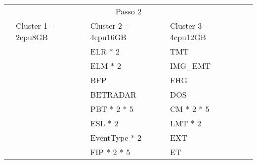 \begin{table}[H]
  \centering
  \small
  \setlength{\extrarowheight}{3pt}
  \setlength{\arrayrulewidth}{1pt}
  
  \begin{tabular}{|l|l|l|l|l|}
    \hline
    \cellcolor{white} & \multicolumn{3}{|c|}{\cellcolor[HTML]{FBE6A3}Passo 2} & \cellcolor{white}              \\ \cline{1-5} 
                                     & \cellcolor[HTML]{4EAC5B}Cluster 1 - 2cpu8GB & \cellcolor[HTML]{4EAC5B}Cluster 2 - 4cpu16GB & \cellcolor[HTML]{4EAC5B}Cluster 3 - 4cpu12GB &                              \\ \cline{1-4}
                                     &                                             & \cellcolor[HTML]{A9D08E}ELR * 2              & \cellcolor[HTML]{BDD7EE}TMT                  &                              \\ \cline{1-4}
                                     &                                             & \cellcolor[HTML]{A9D08E}ELM * 2              & \cellcolor[HTML]{BDD7EE}IMG\_EMT             &                              \\ \cline{1-4}
                                     &                                             & \cellcolor[HTML]{A9D08E}BFP                  & \cellcolor[HTML]{BDD7EE}FHG                  &                              \\ \cline{1-4}
                                     &                                             & \cellcolor[HTML]{A9D08E}BETRADAR             & \cellcolor[HTML]{BDD7EE}DOS                  &                              \\ \cline{1-4}
                                     &                                             & \cellcolor[HTML]{A9D08E}PBT * 2 * 5          & \cellcolor[HTML]{BDD7EE}CM * 2 * 5           &                              \\ \cline{1-4}
                                     &                                             & \cellcolor[HTML]{A9D08E}ESL * 2              & \cellcolor[HTML]{BDD7EE}LMT * 2              &                              \\ \cline{1-4}
                                     &                                             & \cellcolor[HTML]{A9D08E}EventType * 2        & \cellcolor[HTML]{BDD7EE}EXT                  &                              \\ \cline{1-4}
                                     &                                             & \cellcolor[HTML]{A9D08E}FIP * 2 * 5          & \cellcolor[HTML]{BDD7EE}ET                   &                              \\ \cline{1-4}

\end{tabular}
\end{table}

